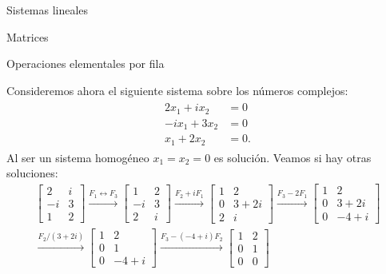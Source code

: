 \begin{chapter}{Sistemas lineales}
\begin{section}{Matrices}
\begin{subsection}{Operaciones elementales por fila}
                
                \begin{ejemplo*}
                    Consideremos ahora el siguiente sistema sobre los números complejos:
                    \begin{align}\label{sist-eq-03}
                    \begin{split}
                    2x_1 +i x_2 &= 0 \\
                    -ix_1 +3x_2  &=0 \\
                    x_1 +2x_2  &= 0.
                    \end{split}
                    \end{align}
                    Al ser un sistema homogéneo $x_1=x_2 = 0$ es solución. Veamos si hay otras soluciones: 
                    \begin{multline*}
                    \begin{bmatrix} 2&i \\ -i&3 \\ 1&2 \end{bmatrix}
                    \stackrel{F_1\leftrightarrow F_3}{\longrightarrow} 
                    \begin{bmatrix} 1&2 \\ -i&3 \\ 2&i \end{bmatrix}
                    \stackrel{F_2+iF_1}{\longrightarrow} 
                    \begin{bmatrix} 1&2 \\ 0&3+2i \\ 2&i \end{bmatrix}
                    \stackrel{F_3-2F_1}{\longrightarrow} 
                    \begin{bmatrix} 1&2 \\ 0&3+2i \\ 0&-4+i \end{bmatrix}
                    \\
                    \stackrel{F_2/(3+2i)}{\longrightarrow} 
                    \begin{bmatrix} 1&2 \\ 0&1 \\ 0&-4+i \end{bmatrix}
                    \stackrel{F_3-(-4+i)F_2}{\longrightarrow} 
                    \begin{bmatrix} 1&2 \\ 0&1 \\ 0&0 \end{bmatrix}

\end{multline*}
\end{ejemplo*}
\end{subsection}
\end{section}
\end{chapter}

